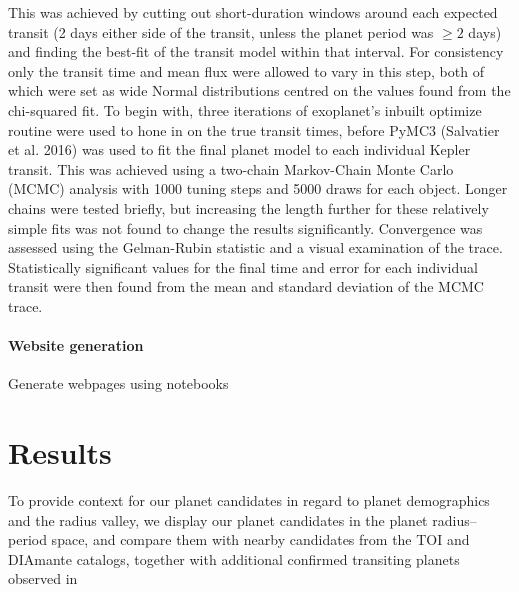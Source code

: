 \documentclass[floatfix,ApJL,twocolumn]{aastex631}
\begin{document}
This was achieved
by cutting out short-duration windows around each expected transit
(2 days either side of the transit, unless the planet period was $\geq2$
days) and finding the best-fit of the transit model within that interval.
For consistency only the transit time and mean flux were allowed to
vary in this step, both of which were set as wide Normal distributions
centred on the values found from the chi-squared fit. To begin with,
three iterations of exoplanet’s inbuilt optimize routine were used
to hone in on the true transit times, before PyMC3 (Salvatier et al.
2016) was used to fit the final planet model to each individual Kepler
transit. This was achieved using a two-chain Markov-Chain Monte
Carlo (MCMC) analysis with 1000 tuning steps and 5000 draws
for each object. Longer chains were tested briefly, but increasing
the length further for these relatively simple fits was not found to
change the results significantly. Convergence was assessed using
the Gelman-Rubin statistic and a visual examination of the trace.
Statistically significant values for the final time and error for each
individual transit were then found from the mean and standard
deviation of the MCMC trace.

%
%
%
%



\paragraph{Website generation}
Generate webpages using notebooks



\section{Results}\label{sec:results}

To provide context for our planet candidates in regard to
planet demographics and the radius valley, we display our
planet candidates in the planet radius–period space, and compare them with nearby candidates from the TOI and DIAmante catalogs, together with additional confirmed transiting planets observed in
\end{document}
